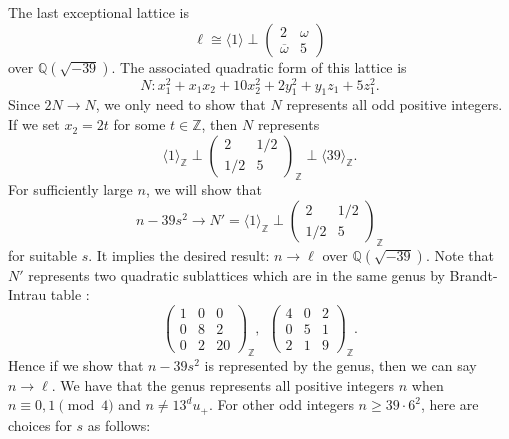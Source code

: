 \documentclass[a4paper,10pt,reqno]{amsart}
\begin{document}
The last exceptional lattice is
\[
    \ell \cong {\langle {1} \rangle} \perp{\begin{pmatrix}
  2 & {\omega} \\
  {{{\overline{\omega}}}} & 5
\end{pmatrix}}
\]
over ${\mathbb{Q}(\sqrt{{-39}})}$. The associated quadratic form of this lattice is
\[
    N: x_1^2 + x_1 x_2 + 10 x_2^2 + 2y_1^2 + y_1 z_1 + 5z_1^2.
\]
Since $2N \to N$, we only need to show that $N$ represents all odd positive integers. If we set
$x_2 = 2t$ for some $t \in {\mathbb{Z}}$, then $N$ represents
\[
    {\langle {1} \rangle}_{\mathbb{Z}} \perp {\begin{pmatrix}
  2 & {1/2} \\
  {1/2} & 5
\end{pmatrix}}_{\mathbb{Z}} \perp {\langle {39} \rangle}_{\mathbb{Z}}.
\]
For sufficiently large $n$, we will show that
\[
    n - 39 s^2 \to  N' = {\langle {1} \rangle}_{\mathbb{Z}} \perp
    {\begin{pmatrix}
  2 & {1/2} \\
  {1/2} & 5
\end{pmatrix}}_{\mathbb{Z}}
\]
for suitable $s$. It implies the desired result: $n \to \ell$ over ${\mathbb{Q}(\sqrt{{-39}})}$. Note that $N'$
represents two quadratic sublattices which are in the same genus by Brandt-Intrau table
\cite{hB_oI}:
\[
    {\begin{pmatrix}
  1 & 0 & 0 \\
  0 & 8 & 2 \\
  0 & 2 & {20}
\end{pmatrix}}_{\mathbb{Z}}, ~~{\begin{pmatrix}
  4 & 0 & 2 \\
  0 & 5 & 1 \\
  2 & 1 & 9
\end{pmatrix}}_{\mathbb{Z}} .
\]
Hence if we show that $n - 39s^2$ is represented by the genus, then we can say $n \to \ell$. We
have that the genus represents all positive integers $n$ when $n \equiv 0,1 \pmod{4}$ and $n \ne
13^d u_{+}$. For other odd integers $n \ge 39 \cdot 6^2$, here are choices for $s$ as follows:
\end{document}
